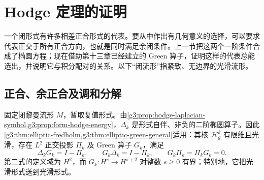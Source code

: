 
% 
% 

\section{Hodge 定理的证明}
\label{g3:sec:1502}

一个闭形式有许多相差正合形式的代表。要从中作出有几何意义的选择，可以要求代表正交于所有正合方向，也就是同时满足余闭条件。上一节把这两个一阶条件合成了椭圆方程；现在借助第十三章已经建立的 Green 算子，证明这样的代表总能选出，并说明它与积分配对的关系。以下“闭流形”指紧致、无边界的光滑流形。

\subsection{正合、余正合及调和分解}
\label{g3:subsec:1502:01}
固定闭黎曼流形 \(M\)，暂取复值形式。由\cref{g3:prop:hodge-laplacian-symbol,g3:prop:form-hodge-energy}，\(\Delta_k\) 是形式自伴、非负的二阶椭圆算子。因此\cref{g3:thm:elliptic-fredholm,g3:thm:elliptic-green-general}适用：其核 \(\mathcal H_g^k\) 有限维且光滑，存在 \(L^2\) 正交投影 \(\Pi_k\) 及 Green 算子 \(G_k\)，满足
\begin{equation}\label{g3:eq:form-green-identities}
	\Delta_kG_k=I-\Pi_k,\qquad
	G_k\Delta_k=I-\Pi_k,\qquad
	G_k\Pi_k=\Pi_kG_k=0.
\end{equation}
第二式的定义域为 \(H^2\)，而 \(G_k:H^s\to H^{s+2}\) 对整数 \(s\ge0\) 有界；特别地，它把光滑形式送到光滑形式。

